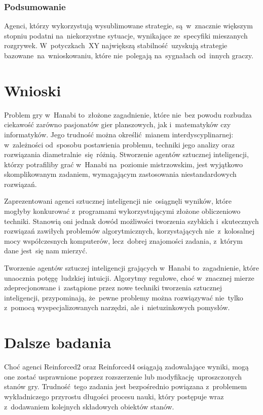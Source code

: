 \documentclass[declaration,shortabstract,inz]{iithesis}
\begin{document}
\subsection*{Podsumowanie}

Agenci, którzy wykorzystują wysublimowane strategie, są~w~znacznie większym stopniu podatni na~niekorzystne sytuacje, wynikające ze~specyfiki mieszanych rozgrywek. W~potyczkach~XY największą stabilność uzyskują strategie bazowane na~wnioskowaniu, które nie~polegają na~sygnałach od~innych graczy.

\chapter{Wnioski}

Problem gry w~Hanabi to~złożone zagadnienie, które nie~bez powodu rozbudza ciekawość zarówno pasjonatów gier planszowych, jak i~matematyków czy informatyków. Jego trudność można określić mianem interdyscyplinarnej: w~zależności od~sposobu postawienia problemu, techniki jego analizy oraz rozwiązania diametralnie~się różnią. Stworzenie agentów sztucznej inteligencji, którzy potrafiliby grać w~Hanabi na~poziomie mistrzowskim, jest wyjątkowo skomplikowanym zadaniem, wymagającym zastosowania niestandardowych rozwiązań.

Zaprezentowani agenci sztucznej inteligencji nie~osiągnęli wyników, które mogłyby konkurować z~programami wykorzystującymi złożone obliczeniowo techniki. Stanowią oni jednak dowód możliwości tworzenia szybkich i~skutecznych rozwiązań zawiłych problemów algorytmicznych, korzystających nie~z~kolosalnej mocy współczesnych komputerów, lecz~dobrej znajomości zadania, z~którym dane jest~się nam mierzyć.

Tworzenie agentów sztuczej inteligencji grających w~Hanabi to~zagadnienie, które unaocznia potęgę ludzkiej intuicji. Algorytmy regułowe, choć w~znacznej mierze zdeprecjonowane i~zastąpione przez nowe techniki tworzenia sztucznej inteligencji, przypominają, że~pewne problemy można rozwiązywać nie~tylko z~pomocą wyspecjalizowanych narzędzi, ale i~nietuzinkowych pomysłów.

\chapter{Dalsze badania}

Choć agenci Reinforced2 oraz Reinforced4 osiągają zadowalające wyniki, mogą one zostać usprawnione poprzez rozszerzenie lub modyfikację uproszczonych stanów gry. Trudność tego zadania jest bezpośrednio powiązana z~problemem wykładniczego przyrostu długości procesu nauki, który postępuje wraz z~dodawaniem kolejnych składowych obiektów stanów.
\end{document}
